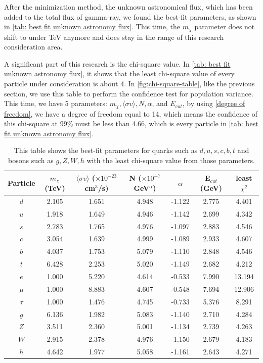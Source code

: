 \documentclass[10pt, oneside]{book}
\numberwithin{equation}{chapter}
\begin{document}
After the minimization method, the unknown astronomical flux, which has been added to the total flux of gamma-ray, we found the best-fit parameters, as shown in \autoref{tab: best fit unknown astronomy flux}. This time, the $m_\chi$ parameter does not shift to under TeV anymore and does stay in the range of this research consideration area.

A significant part of this research is the chi-square value. In \autoref{tab: best fit unknown astronomy flux}, it shows that the least chi-square value of every particle under consideration is about 4. In \autoref{fig:chi-square-table}, like the previous section, we use this table to perform the confidence test for population variance. This time, we have 5 parameters: $m_\chi, \langle \sigma v \rangle, N, \alpha$, and $E_{cut}$, by using \autoref{degree of freedom}, we have a degree of freedom equal to 14, which means the confidence of this chi-square at 99\% must be less than 4.66, which is every particle in \autoref{tab: best fit unknown astronomy flux}.

\begin{table}[h]
    \centering
    \begin{tabular}{|c|c|c|c|c|c|c|}
        \hline
        Particle & $m_\chi $(TeV) & $\langle\sigma v\rangle$ ($\times10^{-23}$ cm$^3$/s) & N ($\times10^{-7}$ GeV$^\alpha$) & $\alpha$ & E$_{cut}$ (GeV) & least $\chi^2$\\ \hline
        $d$ & 2.105 & 1.651 & 4.948 & -1.122 & 2.775 & 4.401\\
         $u$ & 1.918 & 1.649 & 4.946 & -1.142 & 2.699 & 4.342\\
         $s$ & 2.783 & 1.765 & 4.976 & -1.097 & 2.883 & 4.546\\
         $c$ & 3.054 & 1.639 & 4.999 & -1.089 & 2.933 & 4.607\\
         $b$ & 4.037 & 1.753 & 5.079 & -1.110 & 2.848 & 4.546\\
         $t$ & 6.428 & 2.253 & 5.020 & -1.149 & 2.682 & 4.212\\
         $e$ & 1.000 & 5.220 & 4.614 & -0.533 & 7.990 & 13.194\\
         $\mu$ & 1.000 & 8.883 & 4.607 & -0.548 & 7.694 & 12.906\\
         $\tau$ & 1.000 & 1.476 & 4.745 & -0.733 & 5.376 & 8.291\\
         $g$ & 6.136 & 1.982 & 5.083 & -1.140 & 2.710 & 4.284\\
         $Z$ & 3.511 & 2.360 & 5.001 & -1.134 & 2.739 & 4.263\\
         $W$ & 2.915 & 2.378 & 4.976 & -1.150 & 2.679 & 4.183\\
         $h$ & 4.642 & 1.977 & 5.058 & -1.161 & 2.643 & 4.271\\
         \hline
    \end{tabular}
    \caption{This table shows the best-fit parameters for quarks such as $d, u, s, c, b, t$ and bosons such as $g, Z, W, h$ with the least chi-square value from those parameters.}
    \label{tab: best fit unknown astronomy flux}
\end{table}
\end{document}

